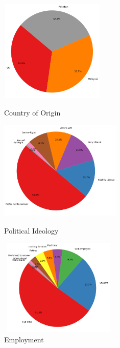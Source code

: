 \documentclass[pt]{article}  %
\begin{document}
\begin{figure}[H]
    \centering
    \begin{minipage}[b]{0.3\textwidth} %
        \centering
        \includegraphics[width=5cm, height=4.85cm]{COO_Distribution.png} %
        \caption{Country of Origin} %
        \label{fig:COO_Distribution} %
    \end{minipage}
    \hfill
    \begin{minipage}[b]{0.3\textwidth} %
        \centering
        \includegraphics[width=5.8cm, height=4.7cm]{PI_Distribution.png} %
        \caption{Political Ideology} %
        \label{fig:PI_Distribution} %
    \end{minipage}
    \hfill
    \begin{minipage}[b]{0.3\textwidth} %
        \centering
        \includegraphics[width=5.6cm, height=4.6cm]{ed-Distribution.png} %
        \caption{Employment} %
        \label{fig:ed-Distribution} %
    \end{minipage}
\end{figure}
\end{document}
